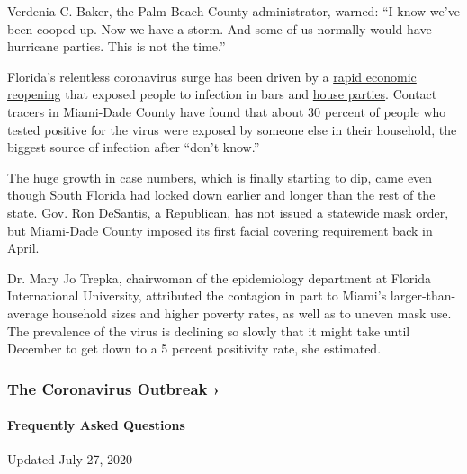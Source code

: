 Verdenia C. Baker, the Palm Beach County administrator, warned: ``I know
we've been cooped up. Now we have a storm. And some of us normally would
have hurricane parties. This is not the time.''

Florida's relentless coronavirus surge has been driven by a
\href{https://www.nytimes.com/2020/06/26/us/coronavirus-florida-texas-bars-closing.html}{rapid
economic reopening} that exposed people to infection in bars and
\href{https://www.nytimes.com/2020/07/06/us/coronavirus-florida-miami.html}{house
parties}. Contact tracers in Miami-Dade County have found that about 30
percent of people who tested positive for the virus were exposed by
someone else in their household, the biggest source of infection after
``don't know.''

The huge growth in case numbers, which is finally starting to dip, came
even though South Florida had locked down earlier and longer than the
rest of the state. Gov. Ron DeSantis, a Republican, has not issued a
statewide mask order, but Miami-Dade County imposed its first facial
covering requirement back in April.

Dr. Mary Jo Trepka, chairwoman of the epidemiology department at Florida
International University, attributed the contagion in part to Miami's
larger-than-average household sizes and higher poverty rates, as well as
to uneven mask use. The prevalence of the virus is declining so slowly
that it might take until December to get down to a 5 percent positivity
rate, she estimated.

\href{https://www.nytimes.com/news-event/coronavirus?action=click\&pgtype=Article\&state=default\&region=MAIN_CONTENT_3\&context=storylines_faq}{}

\hypertarget{the-coronavirus-outbreak-}{%
\subsubsection{The Coronavirus Outbreak
›}\label{the-coronavirus-outbreak-}}

\hypertarget{frequently-asked-questions}{%
\paragraph{Frequently Asked
Questions}\label{frequently-asked-questions}}

Updated July 27, 2020

